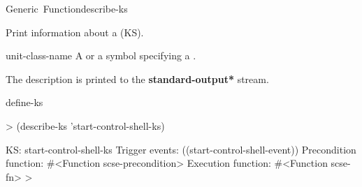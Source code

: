 \documentclass[10pt,twoside,english,pdftex]{article}
\begin{document}
\begin{functiondoc}{Generic~Function}{describe-ks}%
  {}
%
%

\fnsyntax

\fnpurpose
Print information about a  (KS).
 
\fnmethods
{}

\fnpackage {}

\fnmodule {}

\fnargs
\begin{args}{unit-class-name}
   A  or a symbol specifying a
  .
\end{args}

\fndescription
{}%
The description is printed to the {\bf *standard-output*} stream.

\begin{alsos}{define-ks}
\also[define-ks]
\also[ks]
\end{alsos}

\fnexample
%
\W\supp
\begin{example}
  > (describe-ks 'start-control-shell-ks)

  KS: start-control-shell-ks
    Trigger events:        ((start-control-shell-event))
    Precondition function: #<Function scse-precondition>
    Execution function:    #<Function scse-fn>
  >
\end{example}

\end{functiondoc}

\end{document}
